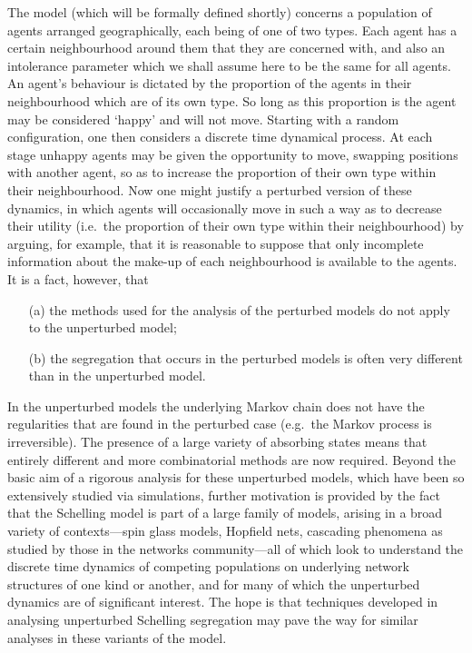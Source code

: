 \documentclass[11pt]{article}
\theoremstyle{plain}
\numberwithin{equation}{subsection}
\begin{document}
The model (which will be formally defined shortly) concerns a population of agents arranged geographically, each being of one of two types. Each agent has a certain neighbourhood around them that they are concerned with, and also an intolerance parameter  which we shall assume here to be the same for all agents. An agent's behaviour is dictated by the proportion of the agents in their neighbourhood which are of its own type. So long as  this proportion is  the agent may be considered `happy' and will not move.  Starting with a random configuration,  one then considers a discrete time dynamical process.  At each stage unhappy agents  may be  given the opportunity to move, swapping positions with another agent,  so as to increase the proportion of their own type within their neighbourhood. Now one might  justify  a perturbed version of these dynamics,  in which  agents will occasionally move in such a way as to decrease their utility (i.e.\  the  proportion of their own type within their neighbourhood) by arguing, for example, that it is reasonable to suppose that only incomplete information about the make-up of each neighbourhood is available to the agents. 
It is a fact, however,  that 
\begin{itemize}
\item[(a)] the methods used for the analysis of
the perturbed models do not apply to the unperturbed model; 
\item[(b)] the segregation that occurs in the perturbed models is often very
different than in the unperturbed model.
\end{itemize}
In the unperturbed models the underlying 
Markov chain does not have the regularities that are found in the perturbed case
(e.g.\ the Markov process is irreversible).  The presence of a large variety of absorbing states means that entirely different and more combinatorial methods are now required. Beyond the basic aim of a rigorous analysis for these unperturbed models, which have been so extensively studied via simulations, further motivation is provided by the fact that the Schelling model is part of a large family of models, arising in a broad variety of contexts---spin glass models, Hopfield nets, cascading phenomena as studied by those in the networks community---all of which look to understand the discrete time dynamics of competing populations on underlying network structures of one kind or another,  and for many of which the unperturbed dynamics are of significant interest.  The hope is that techniques developed in analysing  unperturbed Schelling segregation may pave the way for similar analyses in these variants of the model.  
\end{document}
